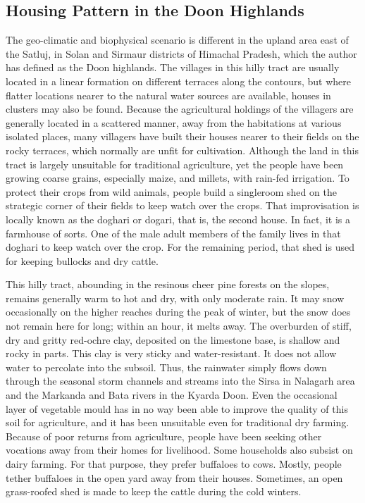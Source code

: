 \subsection*{Housing Pattern in the Doon Highlands}

The geo-climatic and biophysical scenario is different in the upland area east of the Satluj, in Solan and Sirmaur districts of Himachal Pradesh, which the author has defined as the Doon highlands. The villages in this hilly tract are usually located in a linear formation on different terraces along the contours, but where flatter locations nearer to the natural water sources are available, houses in clusters may also be found. Because the agricultural holdings of the villagers are generally located in a scattered manner, away from the habitations at various isolated places, many villagers have built their houses nearer to their fields on the rocky terraces, which normally are unfit for cultivation. Although the land in this tract is largely unsuitable for traditional agriculture, yet the people have been growing coarse grains, especially maize, and millets, with rain-fed irrigation. To protect their crops from wild animals, people build a singleroom shed on the strategic corner of their fields to keep watch over the crops. That improvisation is locally known as the doghari or dogari, that is, the second house. In fact, it is a farmhouse of sorts. One of the male adult members of the family lives in that doghari to keep watch over the crop. For the remaining period, that shed is used for keeping bullocks and dry cattle.

This hilly tract, abounding in the resinous cheer pine forests on the slopes, remains generally warm to hot and dry, with only moderate rain. It may snow occasionally on the higher reaches during the peak of winter, but the snow does not remain here for long; within an hour, it melts away. The overburden of stiff, dry and gritty red-ochre clay, deposited on the limestone base, is shallow and rocky in parts. This clay is very sticky and water-resistant. It does not allow water to percolate into the subsoil. Thus, the rainwater simply flows down through the seasonal storm channels and streams into the Sirsa in Nalagarh area and the Markanda and Bata rivers in the Kyarda Doon. Even the occasional layer of vegetable mould has in no way been able to improve the quality of this soil for agriculture, and it has been unsuitable even for traditional dry farming. Because of poor returns from agriculture, people have been seeking other vocations away from their homes for livelihood. Some households also subsist on dairy farming. For that purpose, they prefer buffaloes to cows. Mostly, people tether buffaloes in the open yard away from their houses. Sometimes, an open grass-roofed shed is made to keep the cattle during the cold winters.

